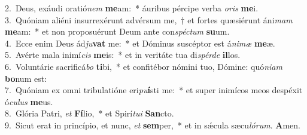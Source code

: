 {2.~}Deus, exáudi oratió\textit{nem} \textbf{me}am:~* áuribus pércipe verba \textit{o}\textit{ris} \textbf{me}i.\\
{3.~}Quóniam aliéni insurrexérunt advérsum me,~† et fortes quæsiérunt áni\textit{mam} \textbf{me}am:~* et non proposuérunt Deum ante con\textit{spé}\textit{ctum} \textbf{su}um.\\
{4.~}Ecce enim Deus ád\textit{ju}\textbf{vat} me:~* et Dóminus suscéptor est á\textit{ni}\textit{mæ} \textbf{me}æ.\\
{5.~}Avérte mala inimí\textit{cis} \textbf{me}is:~* et in veritáte tua di\textit{spér}\textit{de} \textbf{il}los.\\
{6.~}Voluntárie sacrificá\textit{bo} \textbf{ti}bi,~* et confitébor nómini tuo, Dómine: quó\textit{ni}\textit{am} \textbf{bo}num est:\\
{7.~}Quóniam ex omni tribulatióne eri\textit{pu}\textbf{í}sti me:~* et super inimícos meos despéxit ó\textit{cu}\textit{lus} \textbf{me}us.\\
{8.~}Glória Patri, \textit{et} \textbf{Fí}lio,~* et Spirí\textit{tu}\textit{i} \textbf{San}cto.\\
{9.~}Sicut erat in princípio, et nunc, \textit{et} \textbf{sem}per,~* et in sǽcula sæcu\textit{ló}\textit{rum}. \textbf{A}men.\\
